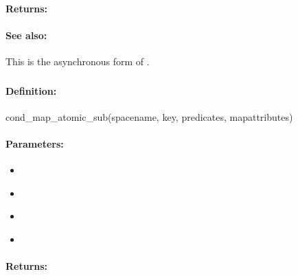 \paragraph{Returns:}


\paragraph{See also:}  This is the asynchronous form of .

\pagebreak
\subsubsection{}
\label{api:ruby:cond_map_atomic_sub}


\paragraph{Definition:}
\begin{rubycode}
cond_map_atomic_sub(spacename, key, predicates, mapattributes)
\end{rubycode}

\paragraph{Parameters:}
\begin{itemize}[noitemsep]
\item {}\\

\item {}\\

\item {}\\

\item {}\\

\end{itemize}

\paragraph{Returns:}


